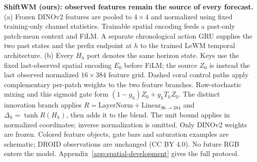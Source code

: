 \textbf{ShiftWM (ours): observed features remain the source of every forecast.} (a) Frozen DINOv2 features are pooled to $4\!\times\!4$ and normalized using fixed training-only channel statistics. Trainable spatial encoding feeds a past-only patch-mean context and FiLM. A separate chronological action GRU supplies the two past states and the prefix endpoint at $h$ to the trained LeWM temporal architecture. (b) Every $H_h$ port denotes the same horizon state. Keys use the fixed last-observed spatial encoding $E_0$ before FiLM; the source $Z_0$ is instead the last observed normalized $16\!\times\!384$ feature grid. Dashed coral control paths apply complementary per-patch weights to the two feature branches. Row-stochastic mixing and this sigmoid gate form $(1-g_h)Z_0+g_hT_hZ_0$. The distinct innovation branch applies $R=\mathrm{LayerNorm}+\mathrm{Linear}_{96\to384}$ and $\Delta_h=\tanh R(H_h)$, then adds it to the blend. The unit bound applies in normalized coordinates; inverse normalization is omitted. Only DINOv2 weights are frozen. Colored feature objects, gate bars and saturation examples are schematic; DROID observations are unchanged (CC BY 4.0). No future RGB enters the model. Appendix~\ref{app:spatial-development} gives the full protocol.
